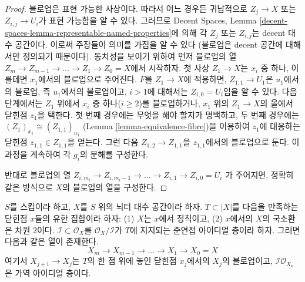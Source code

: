 \begin{proof}
블로업은 표현 가능한 사상이다. 따라서 어느 경우든 귀납적으로
$Z_j \to X$ 또는 $Z_{i, j} \to U_i$가 표현 가능함을 알 수 있다.
그러므로 Decent Spaces, Lemma
\ref{decent-spaces-lemma-representable-named-properties}에 의해
각 $Z_j$ 또는 $Z_{i, j}$는 decent 대수 공간이다.
이로써 주장들이 의미를 가짐을 알 수 있다
(블로업은 decent 공간에 대해서만 정의되기 때문이다).
동치성을 보이기 위하여 먼저 블로업의 열
$Z_m \to Z_{m - 1} \to \ldots \to Z_1 \to Z_0 = X$에서 시작하자.
첫 사상 $Z_1 \to X$는 $x_i$ 중 하나, 이를테면 $x_1$에서의
블로업으로 주어진다. $F$를 $Z_1 \to X$에 적용하면,
$Z_{1, 1} \to U_1$은 $u_1$에서의 블로업, 즉 $u_1$에서의 블로업이고,
$i > 1$에 대해서는 $Z_{i, 0} = U_i$임을 알 수 있다.
다음 단계에서는 $Z_1$ 위에서 $x_i$ 중 하나($i \geq 2$)를
블로업하거나, $x_1$ 위의 $Z_1 \to X$의 올에서 닫힌점 $z_1$을 택한다.
첫 번째 경우에는 무엇을 해야 할지가 명백하고, 두 번째 경우에는
$(Z_1)_{x_1} \cong (Z_{1, 1})_{u_1}$
(Lemma \ref{lemma-equivalence-fibre})을 이용하여 $z_1$에 대응하는
닫힌점 $z_{1, 1} \in Z_{1, 1}$을 얻는다.
그런 다음 $Z_{1, 2} \to Z_{1, 1}$을 $z_{1, 1}$에서의 블로업으로 둔다.
이 과정을 계속하여 각 $g_i$의 분해를 구성한다.

\medskip\noindent
반대로 블로업의 열
$Z_{i, m_i} \to Z_{i, m_i - 1} \to \ldots \to Z_{i, 1} \to Z_{i, 0} = U_i$
가 주어지면, 정확히 같은 방식으로 $X$의 블로업의 열을 구성한다.
\end{proof}

\begin{lemma}
\label{lemma-make-ideal-principal}
$S$를 스킴이라 하고, $X$를 $S$ 위의 뇌터 대수 공간이라 하자.
$T \subset |X|$를 다음을 만족하는 닫힌점 $x$들의 유한 집합이라 하자:
(1) $X$는 $x$에서 정칙이고, (2) $x$에서의 $X$의 국소환은 차원 $2$이다.
$\mathcal{I} \subset \mathcal{O}_X$를
$\mathcal{O}_X/\mathcal{I}$가 $T$에 지지되는 준연접 아이디얼 층이라 하자.
그러면 다음과 같은 열이 존재한다.
$$
X_m \to X_{m - 1} \to \ldots \to X_1 \to X_0 = X
$$
여기서 $X_{j + 1} \to X_j$는 $T$의 한 점 위에 놓인 닫힌점
$x_j$에서의 $X_j$의 블로업이고,
$\mathcal{I}\mathcal{O}_{X_n}$은 가역 아이디얼 층이다.
\end{lemma}

